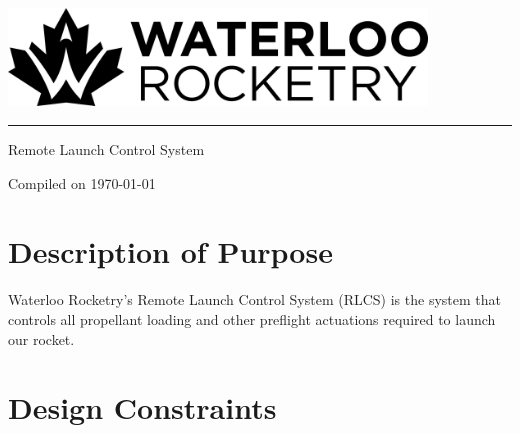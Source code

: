 \documentclass[letter]{article}
\begin{document}
\begin{center}
\vspace*{7cm}
\hspace{7em}\includegraphics[width=30em]{images/mono_horizontal_standard}
\newline
\rule{50em}{2pt}

\vspace{1cm}
\Huge Remote Launch Control System

\vspace*{\fill}
\small Compiled on \today
\end{center}
\newpage
{}

\section{Description of Purpose}
Waterloo Rocketry's Remote Launch Control System (RLCS) is the system that
controls all propellant loading and other preflight actuations required to
launch our rocket.

\section{Design Constraints}

\end{document}
